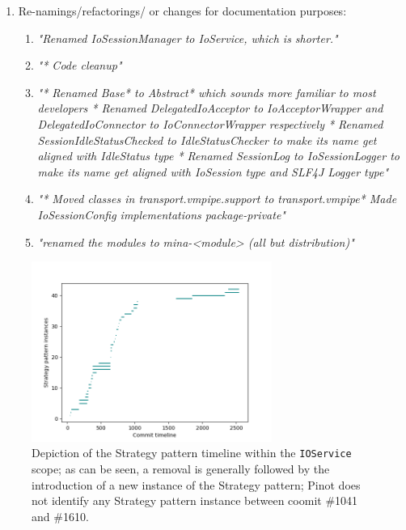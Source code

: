 \begin{enumerate}
    \item Re-namings/refactorings/ or changes for documentation purposes:
        
            
                \begin{enumerate}
                    \item \textit{"Renamed IoSessionManager to IoService, which is shorter."}
                    \item \textit{"* Code cleanup"}
                    \item \textit{"* Renamed Base* to Abstract* which sounds more familiar to most developers
                    * Renamed DelegatedIoAcceptor to IoAcceptorWrapper and DelegatedIoConnector to IoConnectorWrapper respectively
                    * Renamed SessionIdleStatusChecked to IdleStatusChecker to make its name get aligned with IdleStatus type
                    * Renamed SessionLog to IoSessionLogger to make its name get aligned with IoSession type and SLF4J Logger type"}
                    \item \textit{"* Moved classes in transport.vmpipe.support to transport.vmpipe* Made IoSessionConfig implementations package-private"}
                    \item \textit{"renamed the modules to mina-<module> (all but distribution)"}
                \end{enumerate}

\end{enumerate}

\begin{figure}[H]
    \centering
    \includegraphics[width = 0.7\textwidth]{images/strategy_timeline.png}
    \caption{Depiction of the Strategy pattern timeline within the \texttt{IOService} scope; as can be seen, a removal is generally followed by the introduction of a new instance of the Strategy pattern; Pinot does not identify any Strategy pattern instance between coomit \#1041 and \#1610.}
    \label{fig:strategy_timeline}
\end{figure}